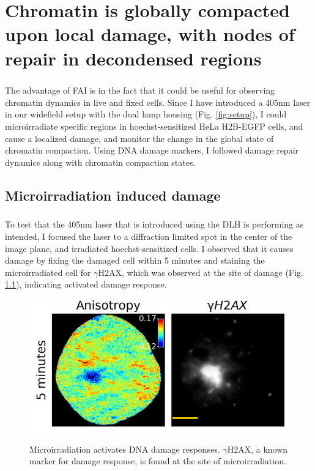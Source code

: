 \chapter{Chromatin is globally compacted upon local damage, with nodes of repair in decondensed regions}

\paragraph*{} The advantage of FAI is in the fact that it could be useful for observing chromatin dynamics in live and fixed cells. Since I have introduced a 405nm laser in our widefield setup with the dual lamp housing (Fig. {\ref{fig:setup}}), I could microirradiate specific regions in hoechst-sensitized HeLa H2B-EGFP cells, and cause a localized damage, and monitor the change in the global state of chromatin compaction. Using DNA damage markers, I followed damage repair dynamics along with chromatin compaction states. 

\section{Microirradiation induced damage}

\paragraph*{} To test that the 405nm laser that is introduced using the DLH is performing as intended, I focused the laser to a diffraction limited spot in the center of the image plane, and irradiated hoechst-sensitized cells. I observed that it causes damage by fixing the damaged cell within 5 minutes and staining the microirradiated cell for $\gamma$H2AX, which was observed at the site of damage (Fig. {\ref{fig:micro_gh2ax}}), indicating activated damage response.

\begin{figure}[!htp]
    {\hfill\includegraphics[clip,width=0.8\linewidth]{figures/micro_gh2ax.png}\hspace*{\fill}}
    \caption{Microirradiation activates DNA damage responses. $\gamma$H2AX, a known marker for damage response, is found at the site of microirradiation.}
    {\label{fig:micro_gh2ax}}
\end{figure}


